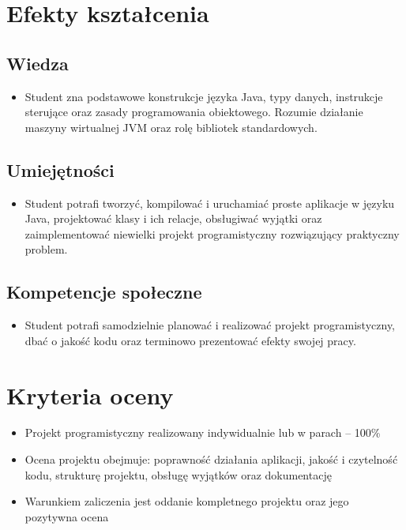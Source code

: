 \documentclass[12pt, a4paper]{article}
\begin{document}
\section{Efekty kształcenia}

\subsection*{Wiedza}
\begin{itemize}
  \item Student zna podstawowe konstrukcje języka Java, typy danych, instrukcje sterujące oraz zasady programowania obiektowego. Rozumie działanie maszyny wirtualnej JVM oraz rolę bibliotek standardowych.
\end{itemize}

\subsection*{Umiejętności}
\begin{itemize}
  \item Student potrafi tworzyć, kompilować i uruchamiać proste aplikacje w języku Java, projektować klasy i ich relacje, obsługiwać wyjątki oraz zaimplementować niewielki projekt programistyczny rozwiązujący praktyczny problem.
\end{itemize}

\subsection*{Kompetencje społeczne}
\begin{itemize}
  \item Student potrafi samodzielnie planować i realizować projekt programistyczny, dbać o jakość kodu oraz terminowo prezentować efekty swojej pracy.
\end{itemize}

\section{Kryteria oceny}

\begin{itemize}
  \item Projekt programistyczny realizowany indywidualnie lub w parach – 100\%
  \item Ocena projektu obejmuje: poprawność działania aplikacji, jakość i czytelność kodu, strukturę projektu, obsługę wyjątków oraz dokumentację
  \item Warunkiem zaliczenia jest oddanie kompletnego projektu oraz jego pozytywna ocena
\end{itemize}
\end{document}
